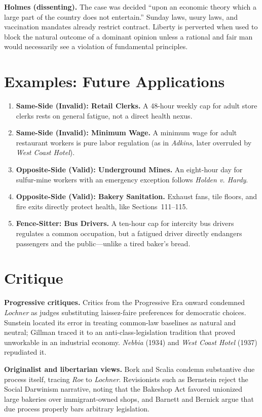 \documentclass[12pt]{article}
\begin{document}
\textbf{Holmes (dissenting).} The case was decided ``upon an economic theory which a large part of the country does not entertain.'' Sunday laws, usury laws, and vaccination mandates already restrict contract. Liberty is perverted when used to block the natural outcome of a dominant opinion unless a rational and fair man would necessarily see a violation of fundamental principles.

\section{Examples: Future Applications}

\begin{enumerate}
\item \textbf{Same-Side (Invalid): Retail Clerks.} A 48-hour weekly cap for adult store clerks rests on general fatigue, not a direct health nexus.
\item \textbf{Same-Side (Invalid): Minimum Wage.} A minimum wage for adult restaurant workers is pure labor regulation (as in \textit{Adkins}, later overruled by \textit{West Coast Hotel}).
\item \textbf{Opposite-Side (Valid): Underground Mines.} An eight-hour day for sulfur-mine workers with an emergency exception follows \textit{Holden v. Hardy}.
\item \textbf{Opposite-Side (Valid): Bakery Sanitation.} Exhaust fans, tile floors, and fire exits directly protect health, like Sections~111--115.
\item \textbf{Fence-Sitter: Bus Drivers.} A ten-hour cap for intercity bus drivers regulates a common occupation, but a fatigued driver directly endangers passengers and the public---unlike a tired baker's bread.
\end{enumerate}

\section{Critique}

\textbf{Progressive critiques.} Critics from the Progressive Era onward condemned \textit{Lochner} as judges substituting laissez-faire preferences for democratic choices. Sunstein located its error in treating common-law baselines as natural and neutral; Gillman traced it to an anti-class-legislation tradition that proved unworkable in an industrial economy. \textit{Nebbia} (1934) and \textit{West Coast Hotel} (1937) repudiated it.

\textbf{Originalist and libertarian views.} Bork and Scalia condemn substantive due process itself, tracing \textit{Roe} to \textit{Lochner}. Revisionists such as Bernstein reject the Social Darwinism narrative, noting that the Bakeshop Act favored unionized large bakeries over immigrant-owned shops, and Barnett and Bernick argue that due process properly bars arbitrary legislation.
\end{document}
